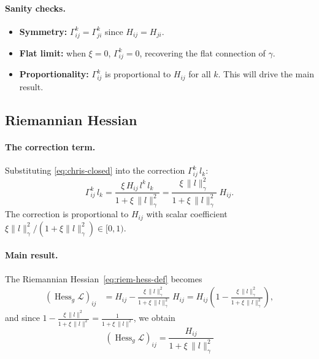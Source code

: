 \documentclass{article}
\newcommand{\loss}{\mathcal{L}}
\begin{document}
\paragraph{Sanity checks.}
\begin{itemize}[leftmargin=1.8em]
    \item \textbf{Symmetry:} $\Gamma^k_{ij} = \Gamma^k_{ji}$ since $H_{ij}=H_{ji}$.\ \checkmark
    \item \textbf{Flat limit:} when $\xi=0$, $\Gamma^k_{ij}=0$,
          recovering the flat connection of $\gamma$.\ \checkmark
    \item \textbf{Proportionality:}
          $\Gamma^k_{ij}$ is proportional to $H_{ij}$ for all $k$.
          This will drive the main result.
\end{itemize}

\subsection{Riemannian Hessian}\label{sec:riem-hess}

\paragraph{The correction term.}
Substituting \eqref{eq:chris-closed} into the correction
$\Gamma^k_{ij}\,l_k$:
\begin{equation}\label{eq:correction}
    \Gamma^k_{ij}\,l_k
    = \frac{\xi\,H_{ij}\,l^k\,l_k}{1+\xi\,\|l\|_\gamma^2}
    = \frac{\xi\,\|l\|_\gamma^2}{1+\xi\,\|l\|_\gamma^2}\;H_{ij}.
\end{equation}
The correction is proportional to $H_{ij}$ with scalar coefficient
$\xi\|l\|_\gamma^2/(1+\xi\|l\|_\gamma^2) \in [0,1)$.

\paragraph{Main result.}
The Riemannian Hessian~\eqref{eq:riem-hess-def}
becomes
\begin{align}
    (\operatorname{Hess}_g\loss)_{ij}
    &= H_{ij} - \frac{\xi\,\|l\|_\gamma^2}{1+\xi\,\|l\|_\gamma^2}\;H_{ij}
    = H_{ij}\left(1 - \frac{\xi\,\|l\|_\gamma^2}{1+\xi\,\|l\|_\gamma^2}\right),
\end{align}
and since $1 - \frac{\xi\,\|l\|^2}{1+\xi\,\|l\|^2}
= \frac{1}{1+\xi\,\|l\|^2}$, we obtain
\begin{equation}\label{eq:riem-hess}
    \boxed{\;
    (\operatorname{Hess}_g\loss)_{ij}
    = \frac{H_{ij}}{1+\xi\,\|l\|_\gamma^2}
    \;}
\end{equation}
\end{document}
